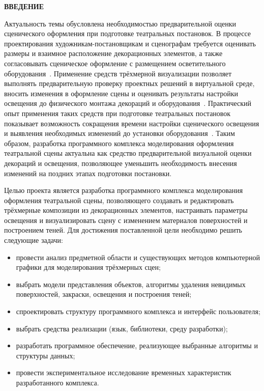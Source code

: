 \newpage
\begingroup
\setlength{\parskip}{0pt}
\setlength{\emergencystretch}{2em}
\hypersetup{hidelinks}
{}
{\centering\normalsize\bfseries ВВЕДЕНИЕ\par}
\vspace{\baselineskip}

Актуальность темы обусловлена необходимостью предварительной оценки сценического оформления при подготовке театральных постановок. В процессе проектирования художникам-постановщикам и сценографам требуется оценивать размеры и взаимное расположение декорационных элементов, а также согласовывать сценическое оформление с размещением осветительного оборудования~\cite{utexas-scenic-design}. Применение средств трёхмерной визуализации позволяет выполнять предварительную проверку проектных решений в виртуальной среде, вносить изменения в оформление сцены и оценивать результаты настройки освещения до физического монтажа декораций и оборудования~\cite{simpson-eva2018}. Практический опыт применения таких средств при подготовке театральных постановок показывает возможность сокращения времени настройки сценического освещения и выявления необходимых изменений до установки оборудования~\cite{wysiwyg-miss-saigon}. Таким образом, разработка программного комплекса моделирования оформления театральной сцены актуальна как средство предварительной визуальной оценки декораций и освещения, позволяющее уменьшить необходимость внесения изменений на поздних этапах подготовки постановки.

Целью проекта является разработка программного комплекса моделирования оформления театральной сцены, позволяющего создавать и редактировать трёхмерные композиции из декорационных элементов, настраивать параметры освещения и визуализировать сцену с изменением материалов поверхностей и построением теней.
Для достижения поставленной цели необходимо решить следующие задачи:

\begin{itemize}
	\item провести анализ предметной области и существующих методов компьютерной графики для моделирования трёхмерных сцен;
	\item выбрать модели представления объектов, алгоритмы удаления невидимых поверхностей, закраски, освещения и построения теней;
	\item спроектировать структуру программного комплекса и интерфейс пользователя;
	\item выбрать средства реализации (язык, библиотеки, среду разработки);
	\item разработать программное обеспечение, реализующее выбранные алгоритмы и структуры данных;
	\item провести экспериментальное исследование временных характеристик разработанного комплекса.
\end{itemize}

\newpage

\endgroup
